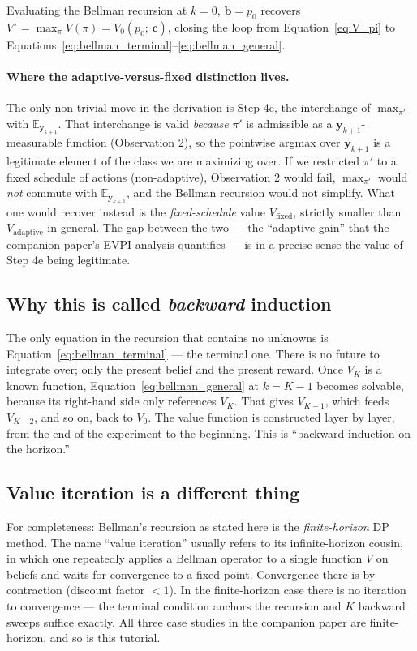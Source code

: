 \documentclass[11pt]{article}
\newcommand{\bc}{\bm{c}}
\newcommand{\by}{\bm{y}}
\newcommand{\bb}{\bm{b}}
\newcommand{\E}{\mathbb{E}}
\begin{document}
Evaluating the Bellman recursion at $k = 0$, $\bb = p_0$ recovers $V^\star = \max_\pi V(\pi) = V_0(p_0;\, \bc)$, closing the loop from Equation~\eqref{eq:V_pi} to Equations~\eqref{eq:bellman_terminal}--\eqref{eq:bellman_general}.

\paragraph{Where the adaptive-versus-fixed distinction lives.}  The only non-trivial move in the derivation is Step 4e, the interchange of $\max_{\pi'}$ with $\E_{\by_{k+1}}$.  That interchange is valid \emph{because} $\pi'$ is admissible as a $\by_{k+1}$-measurable function (Observation 2), so the pointwise argmax over $\by_{k+1}$ is a legitimate element of the class we are maximizing over.  If we restricted $\pi'$ to a fixed schedule of actions (non-adaptive), Observation 2 would fail, $\max_{\pi'}$ would \emph{not} commute with $\E_{\by_{k+1}}$, and the Bellman recursion would not simplify.  What one would recover instead is the \emph{fixed-schedule} value $V_{\text{fixed}}$, strictly smaller than $V_{\text{adaptive}}$ in general.  The gap between the two --- the ``adaptive gain'' that the companion paper's EVPI analysis quantifies --- is in a precise sense the value of Step 4e being legitimate.

\subsection{Why this is called \emph{backward} induction}

The only equation in the recursion that contains no unknowns is Equation~\eqref{eq:bellman_terminal} --- the terminal one.  There is no future to integrate over; only the present belief and the present reward.  Once $V_K$ is a known function, Equation~\eqref{eq:bellman_general} at $k = K-1$ becomes solvable, because its right-hand side only references $V_K$.  That gives $V_{K-1}$, which feeds $V_{K-2}$, and so on, back to $V_0$.  The value function is constructed layer by layer, from the end of the experiment to the beginning.  This is ``backward induction on the horizon.''

\subsection{Value iteration is a different thing}

For completeness: Bellman's recursion as stated here is the \emph{finite-horizon} DP method.  The name ``value iteration'' usually refers to its infinite-horizon cousin, in which one repeatedly applies a Bellman operator to a single function $V$ on beliefs and waits for convergence to a fixed point.  Convergence there is by contraction (discount factor $< 1$).  In the finite-horizon case there is no iteration to convergence --- the terminal condition anchors the recursion and $K$ backward sweeps suffice exactly.  All three case studies in the companion paper are finite-horizon, and so is this tutorial.
\end{document}
